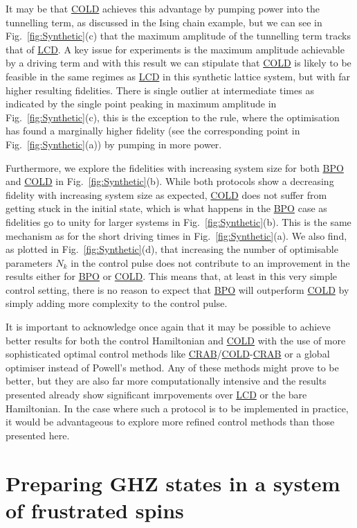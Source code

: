 \documentclass[a4paper,oneside,11pt]{book}
\newcommand{\acrref}[1]{\hyperref[acr:#1]{#1}}
\begin{document}
It may be that \acrref{COLD} achieves this advantage by pumping power into the tunnelling term, as discussed in the Ising chain example, but we can see in Fig.~\ref{fig:Synthetic}(c) that the maximum amplitude of the tunnelling term tracks that of \acrref{LCD}. A key issue for experiments is the maximum amplitude achievable by a driving term and with this result we can stipulate that \acrref{COLD} is likely to be feasible in the same regimes as \acrref{LCD} in this synthetic lattice system, but with far higher resulting fidelities. There is single outlier at intermediate times as indicated by the single point peaking in maximum amplitude in Fig.~\ref{fig:Synthetic}(c), this is the exception to the rule, where the optimisation has found a marginally higher fidelity (see the corresponding point in Fig.~\ref{fig:Synthetic}(a)) by pumping in more power.

Furthermore, we explore the fidelities with increasing system size for both \acrref{BPO} and \acrref{COLD} in Fig.~\ref{fig:Synthetic}(b). While both protocols show a decreasing fidelity with increasing system size as expected, \acrref{COLD} does not suffer from getting stuck in the initial state, which is what happens in the \acrref{BPO} case as fidelities go to unity for larger systems in Fig.~\ref{fig:Synthetic}(b). This is the same mechanism as for the short driving times in Fig.~\ref{fig:Synthetic}(a). We also find, as plotted in Fig.~\ref{fig:Synthetic}(d), that increasing the number of optimisable parameters $N_k$ in the control pulse does not contribute to an improvement in the results either for \acrref{BPO} or \acrref{COLD}. This means that, at least in this very simple control setting, there is no reason to expect that \acrref{BPO} will outperform \acrref{COLD} by simply adding more complexity to the control pulse.

It is important to acknowledge once again that it may be possible to achieve better results for both the control Hamiltonian and \acrref{COLD} with the use of more sophisticated optimal control methods like \acrref{CRAB}/\acrref{COLD}-\acrref{CRAB} or a global optimiser instead of Powell's method. Any of these methods might prove to be better, but they are also far more computationally intensive and the results presented already show significant imrpovements over \acrref{LCD} or the bare Hamiltonian. In the case where such a protocol is to be implemented in practice, it would be advantageous to explore more refined control methods than those presented here.

\section{Preparing GHZ states in a system of frustrated spins}\label{sec:6.4_ghz_states}
\end{document}
